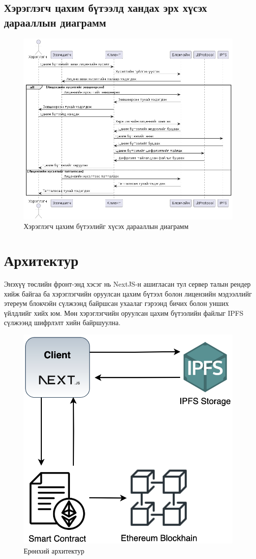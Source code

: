 \subsection{Хэрэглэгч цахим бүтээлд хандах эрх хүсэх дарааллын диаграмм}
\begin{figure}[h!]
	\centering
	\includegraphics[scale=0.6, angle=90]{src/images/sequence-2.png}
	\caption{Хэрэглэгч цахим бүтээлийг хүсэх дарааллын диаграмм}
\end{figure}

\newpage
\section{Архитектур}
Энэхүү төслийн фронт-энд хэсэг нь NextJS-н ашигласан тул сервер талын рендер хийж байгаа ба хэрэглэгчийн оруулсан цахим бүтээл болон лицензийн мэдээллийг этереум блокчэйн сүлжээнд байршсан ухаалаг гэрээнд бичих болон унших үйлдлийг хийх юм. Мөн хэрэглэгчийн оруулсан цахим бүтээлийн файлыг IPFS сүлжээнд шифрлэлт хийн байршуулна.

\begin{figure}[h!]
	\centering
	\includegraphics[scale=0.4]{src/images/architecture.png}
	\caption{Ерөнхий архитектур}
\end{figure}
